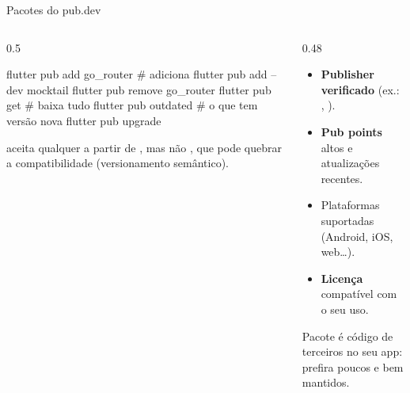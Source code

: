 \documentclass[aspectratio=169,10pt]{beamer}
\begin{document}
\begin{frame}[fragile]{Pacotes do pub.dev}
  \begin{columns}[T]
    \begin{column}{0.5\textwidth}
\begin{terminal}[title=Gerenciando dependências]
flutter pub add go_router     # adiciona
flutter pub add --dev mocktail
flutter pub remove go_router
flutter pub get               # baixa tudo
flutter pub outdated          # o que tem versão nova
flutter pub upgrade
\end{terminal}
      \begin{conceito}[Versões]
         aceita qualquer  a partir de , mas não , que pode quebrar a compatibilidade (versionamento semântico).
      \end{conceito}
    \end{column}
    \begin{column}{0.48\textwidth}
      \begin{dica}
        \begin{itemize}
          \item \textbf{Publisher verificado} (ex.: , ).
          \item \textbf{Pub points} altos e atualizações recentes.
          \item Plataformas suportadas (Android, iOS, web\ldots).
          \item \textbf{Licença} compatível com o seu uso.
        \end{itemize}
      \end{dica}
      \begin{atencao}
        Pacote é código de terceiros no seu app: prefira poucos e bem mantidos.
      \end{atencao}
    \end{column}
  \end{columns}
\end{frame}
\end{document}
